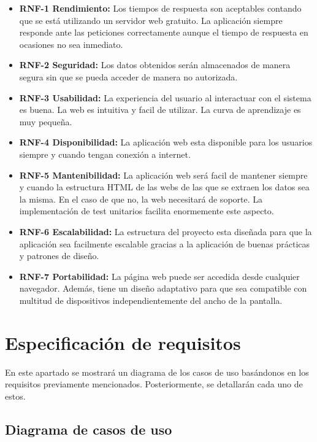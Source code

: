 \begin{itemize}
\item\textbf{RNF-1 Rendimiento:} Los tiempos de respuesta son aceptables contando que se está utilizando un servidor web gratuito. La aplicación siempre responde ante las peticiones correctamente aunque el tiempo de respuesta en ocasiones no sea inmediato.
\item\textbf{RNF-2 Seguridad:} Los
datos obtenidos serán almacenados de manera segura sin que se pueda acceder de manera no autorizada. 
\item\textbf{RNF-3 Usabilidad:} La experiencia del usuario al interactuar con el sistema es buena. La web es intuitiva y facil de utilizar. La curva de aprendizaje es muy pequeña. 
\item\textbf{RNF-4 Disponibilidad:} La aplicación web esta disponible para los usuarios siempre y cuando tengan conexión a internet.
\item\textbf{RNF-5 Mantenibilidad:} La aplicación web será facil de mantener siempre y cuando la estructura HTML de las webs de las que se extraen los datos sea la misma. En el caso de que no, la web necesitará de soporte. La implementación de test unitarios facilita enormemente este aspecto.
\item\textbf{RNF-6 Escalabilidad:} La estructura del proyecto esta diseñada para que la aplicación sea facilmente escalable gracias a la aplicación de buenas prácticas y patrones de diseño.
\item\textbf{RNF-7 Portabilidad:} La página web puede ser accedida desde cualquier navegador. Además, tiene un diseño adaptativo para que sea compatible con multitud de dispositivos independientemente del ancho de la pantalla.

\end{itemize}

\section{Especificación de requisitos}
En este apartado se mostrará un diagrama de los casos de uso basándonos en los requisitos previamente mencionados. Posteriormente, se detallarán cada uno de estos.

\newpage
\begin{landscape}
\subsection{Diagrama de casos de uso}\label{diagrama-de-casos-de-uso}
\vspace{1cm}
\end{landscape}
\newpage

